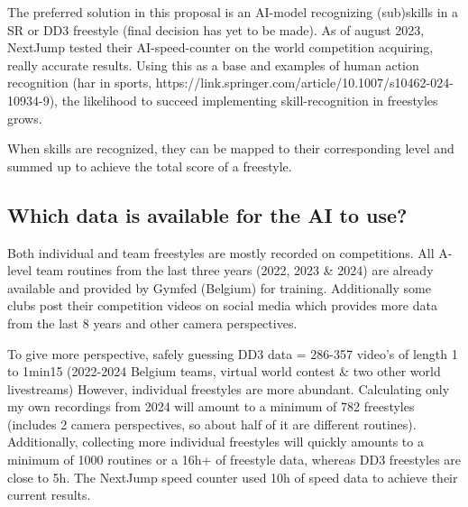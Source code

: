 The preferred solution in this proposal is an AI-model recognizing (sub)skills in a SR or DD3 freestyle (final decision has yet to be made). As of august 2023, NextJump tested their AI-speed-counter on the world competition acquiring, really accurate results.
Using this as a base and examples of human action recognition (har in sports, https://link.springer.com/article/10.1007/s10462-024-10934-9), the likelihood to succeed implementing skill-recognition in freestyles grows. %

When skills are recognized, they can be mapped to their corresponding level and summed up to achieve the total score of a freestyle.

\subsection{Which data is available for the AI to use?}

Both individual and team freestyles are mostly recorded on competitions. All A-level team routines from the last three years (2022, 2023 \& 2024) are already available and provided by Gymfed (Belgium) for training. Additionally some clubs post their competition videos on social media which provides more data from the last 8 years and other camera perspectives.

To give more perspective, safely guessing DD3 data = 286-357 video's of length 1 to 1min15 (2022-2024 Belgium teams, virtual world contest \& two other world livestreams)
However, individual freestyles are more abundant. Calculating only my own recordings from 2024 will amount to a minimum of 782 freestyles (includes 2 camera perspectives, so about half of it are different routines). Additionally, collecting more individual freestyles will quickly amounts to a minimum of 1000 routines or a 16h+ of freestyle data, whereas DD3 freestyles are close to 5h. The NextJump speed counter used 10h of speed data to achieve their current results.


    
